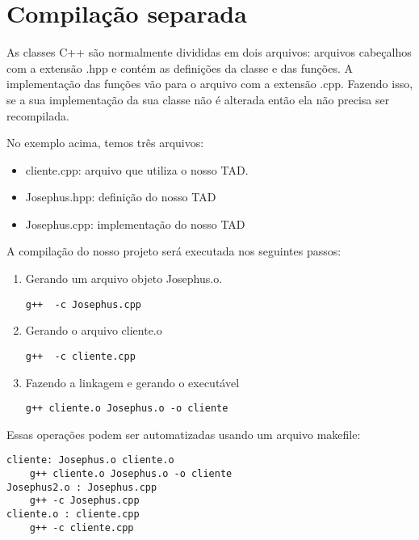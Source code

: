 \section{Compilação separada}

As classes C++ são normalmente divididas em dois arquivos: arquivos cabeçalhos com a extensão .hpp e contém as definições da classe e das funções. A implementação das funções vão para o arquivo com a extensão .cpp. Fazendo isso, se a sua implementação da sua classe não é alterada então ela não precisa ser recompilada. 

No exemplo acima, temos três arquivos:
\begin{itemize}
    \item cliente.cpp: arquivo que utiliza o nosso TAD.
    \item Josephus.hpp: definição do nosso TAD
    \item Josephus.cpp: implementação do nosso TAD
\end{itemize}


A compilação do nosso projeto será executada nos seguintes passos:

\begin{enumerate}

\item Gerando um arquivo objeto Josephus.o.

\begin{verbatim}
g++  -c Josephus.cpp
\end{verbatim}


\item Gerando o arquivo cliente.o

\begin{verbatim}
g++  -c cliente.cpp
\end{verbatim}


\item Fazendo a linkagem e gerando o executável
\begin{verbatim}
g++ cliente.o Josephus.o -o cliente 
\end{verbatim}

\end{enumerate}

Essas operações podem ser automatizadas usando um arquivo makefile:

\begin{verbatim}
cliente: Josephus.o cliente.o
	g++ cliente.o Josephus.o -o cliente 
Josephus2.o : Josephus.cpp
	g++ -c Josephus.cpp
cliente.o : cliente.cpp
	g++ -c cliente.cpp
\end{verbatim}

